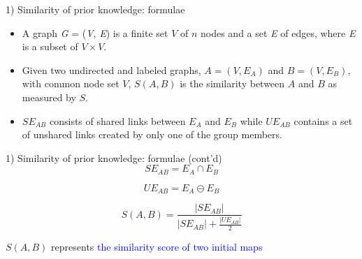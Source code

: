 \begin{frame}{1) Similarity of prior knowledge: formulae}
    \begin{itemize}
        \item A graph \textit{G} = (\textit{V}, \textit{E}) is a finite set $V$ 
        of $n$ nodes and a set \textit{E} of edges, where \textit{E} is a 
        subset of $V \times V$.
        \item Given two undirected and labeled graphs, $A = (V, E_A)$ and 
        $B = (V, E_B)$, with common node set $V$, $S(A, B)$ is the similarity 
        between $A$ and $B$ as measured by $S$. 
        \item $SE_{AB}$ consists of shared links between $E_A$ and $E_B$ 
        while $UE_{AB}$ contains a set of unshared links created by 
        only one of the group members.
    \end{itemize}
\end{frame}

\begin{frame}{1) Similarity of prior knowledge: formulae (cont'd)}
    \begin{equation}
      SE_{AB} = E_A \cap E_B \label{eq:1}
    \end{equation}
    
    \begin{equation}
      UE_{AB} = E_A \ominus E_B \label{eq:2}
    \end{equation}
    
    \begin{equation}
      S(A, B) = \frac{|SE_{AB}|}{{|SE_{AB}| + \frac{|UE_{AB}|}{2}}} \label{eq:3}
    \end{equation}
    
    $S(A, B)$ represents \textcolor{blue}{the similarity score of two initial maps}
\end{frame}

